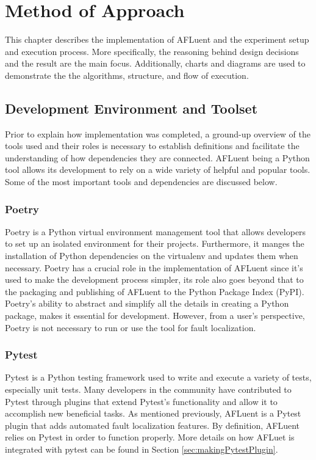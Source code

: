 \chapter{Method of Approach}
\label{ch:method}

This chapter describes the implementation of AFLuent and the experiment setup and
execution process. More specifically, the reasoning behind design decisions and
the result are the main focus. Additionally, charts and diagrams  are used to
demonstrate the the algorithms, structure, and flow of execution.

\section{Development Environment and Toolset}
\label{sec:DevEnviron}

Prior to explain how implementation was completed, a ground-up overview of the
tools used and their roles is necessary to establish definitions and facilitate
the understanding of how dependencies they are connected. AFLuent being a Python
tool allows its development to rely on a wide variety of helpful and popular
tools. Some of the most important tools and dependencies are discussed below.

\subsection{Poetry}
\label{subsec:poetry}

Poetry is a Python virtual environment management tool that allows developers to
set up an isolated environment for their projects. Furthermore, it manges the
installation of Python dependencies on the virtualenv and updates them when
necessary. Poetry has a crucial role in the implementation of AFLuent since it's
used to make the development process simpler, its role also goes beyond
that to the packaging and publishing of AFLuent to the Python Package Index
(PyPI). Poetry's ability to abstract and simplify all the details in creating a
Python package, makes it essential for development. However, from a user's
perspective, Poetry is not necessary to run or use the tool for fault localization.

\subsection{Pytest}
\label{subsec:pytest}

Pytest is a Python testing framework used to write and execute a variety of
tests, especially unit tests. Many developers in the community have contributed
to Pytest through plugins that extend Pytest's functionality and allow it to
accomplish new beneficial tasks. As mentioned previously, AFLuent is a Pytest
plugin that adds automated fault localization features. By definition, AFLuent
relies on Pytest in order to function properly. More details on how AFLuet is
integrated with pytest can be found in Section \ref{sec:makingPytestPlugin}.


